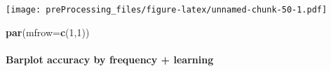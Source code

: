 \documentclass[
]{article}
\newenvironment{Shaded}{\begin{snugshade}}{\end{snugshade}}
\newcommand{\DataTypeTok}[1]{\textcolor[rgb]{0.13,0.29,0.53}{#1}}
\newcommand{\DecValTok}[1]{\textcolor[rgb]{0.00,0.00,0.81}{#1}}
\newcommand{\KeywordTok}[1]{\textcolor[rgb]{0.13,0.29,0.53}{\textbf{#1}}}
\newcommand{\NormalTok}[1]{#1}
\begin{document}
\texttt{[image: preProcessing\_files/figure-latex/unnamed-chunk-50-1.pdf]}

\begin{Shaded}
\begin{Highlighting}[]
\KeywordTok{par}\NormalTok{(}\DataTypeTok{mfrow=}\KeywordTok{c}\NormalTok{(}\DecValTok{1}\NormalTok{,}\DecValTok{1}\NormalTok{))}
\end{Highlighting}
\end{Shaded}

\hypertarget{barplot-accuracy-by-frequency-learning}{%
\paragraph{Barplot accuracy by frequency +
learning}\label{barplot-accuracy-by-frequency-learning}}
\end{document}
